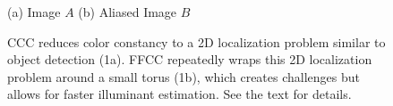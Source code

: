 \documentclass[10pt,twocolumn,letterpaper]{article}
\begin{document}
\begin{figure}[!]
\centering
    {(a) Image $A$}
    {(b) Aliased Image $B$}
  \caption{
  CCC \cite{BarronICCV2015} reduces color constancy
  to a 2D localization problem similar to object detection (1a).
  FFCC repeatedly wraps this 2D localization problem around a small torus (1b),
  which creates challenges but allows for faster illuminant estimation.
  See the text for details.
  \label{fig:face}
  }
\end{figure}

\newcommand{\mypm}{\mathbin{\smash{%
\raisebox{0.35ex}{%
            $\underset{\raisebox{0.5ex}{$\smash -$}}{\smash+}$%
            }%
        }%
    }%
}
\end{document}
